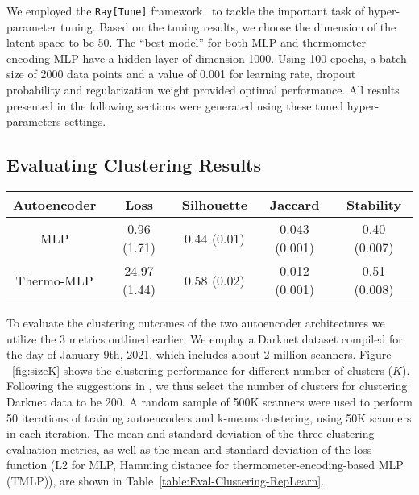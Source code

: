 \documentclass[manuscript, nonacm]{acmart}
\begin{document}
We employed the \texttt{Ray[Tune]} framework~\cite{raytune} to tackle the important task of hyper-parameter tuning.
Based on the tuning results, we choose the dimension of the latent space to be 50. 
The “best model” for both MLP and thermometer encoding MLP 
have a hidden layer 
of dimension 1000.
Using 100 epochs, a batch size of 2000 data points
and a value of 0.001 for learning rate, dropout probability and regularization weight
provided optimal performance. 
All results presented in the following sections were generated using these 
tuned hyper-parameters settings.


\subsection{Evaluating Clustering Results}

\begin{table*}[t]
    \centering
    \caption{Evaluation of Clustering through Representation Learning}
    \label{table:Eval-Clustering-RepLearn}
    \begin{tabular}{c|c|c|c|c}
    \hline
    \textbf{Autoencoder}   & \textbf{Loss} & \textbf{Silhouette} & \textbf{Jaccard} & \textbf{Stability} \\
     \hline 
      MLP   & 0.96 (1.71) & 0.44 (0.01) & 0.043 (0.001) & 0.40 (0.007) \\
      Thermo-MLP  & 24.97 (1.44) & 0.58 (0.02) & 0.012 (0.001) & 0.51 (0.008) \\
      \hline
    \end{tabular}
\end{table*}

To evaluate the clustering outcomes of the two autoencoder architectures we
utilize the 3 metrics outlined earlier.
We employ a Darknet dataset compiled for the day of January 9th, 2021, which includes about 2 million scanners. 
Figure ~\ref{fig:sizeK} shows the clustering performance for different
number of clusters ($K$).  
Following the suggestions in \cite{halkidi2001survey}, we thus
select the number of clusters for clustering Darknet data to be 200.
A random sample of 500K scanners were used to perform 50 iterations of training autoencoders and k-means clustering, using 50K scanners in each iteration.  The mean and standard deviation of the three clustering evaluation metrics, as well as the mean and standard deviation of the loss function (L2 for MLP, Hamming distance for thermometer-encoding-based MLP (TMLP)), are shown in Table~\ref{table:Eval-Clustering-RepLearn}. 
\end{document}
